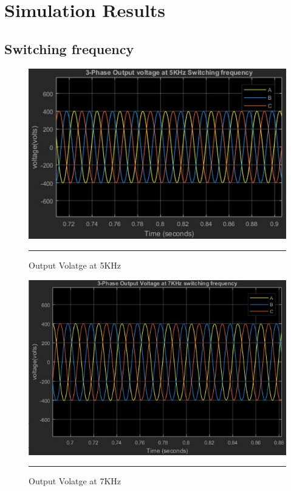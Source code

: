 
\chapter{Simulation Results} %
\label{Chapter5}
\section{Switching frequency}
\begin{figure}[htbp]
	\centering
	\includegraphics[width = 6in]{./Figures/5k.JPG}
	\rule{35em}{1pt}
	\caption{Output Volatge at 5KHz}
\end{figure}
\begin{figure}[htbp]
	\centering
	\includegraphics[width = 6in]{./Figures/7k.JPG}
	\rule{35em}{1pt}
	\caption{Output Volatge at 7KHz}
\end{figure}
